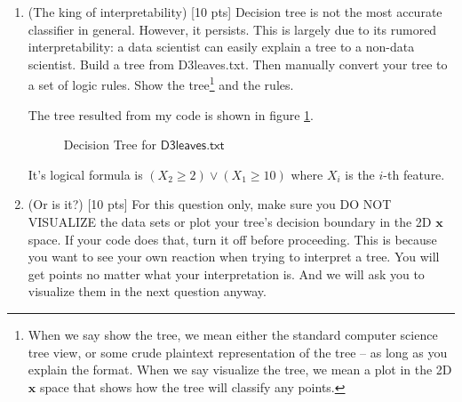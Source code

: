 \documentclass[a4paper]{article}
\theoremstyle{definition}
\def\x{\mathbf x}
\newenvironment{soln}{
    \leavevmode\color{blue}\ignorespaces
}{}
\begin{document}
\begin{enumerate}
\begin{soln}
\end{soln}

\item (The king of interpretability)  [10 pts] Decision tree is not the most accurate classifier in general.  However, it persists.  This is largely due to its rumored interpretability: a data scientist can easily explain a tree to a non-data scientist.  Build a tree from D3leaves.txt.  Then manually convert your tree to a set of logic rules.  Show the tree\footnote{When we say show the tree, we mean either the standard computer science tree view, or some crude plaintext representation of the tree -- as long as you explain the format.  When we say visualize the tree, we mean a plot in the 2D $\x$ space that shows how the tree will classify any points.} and the rules. \\

\begin{soln}
    The tree resulted from my code is shown in figure \ref{fig:2}.
    \begin{figure}[H]
        \centering
        \caption{Decision Tree for $\mathsf{D3leaves.txt}$}
        \label{fig:2}
    \end{figure}

    It's logical formula is $(X_2 \geq 2) \vee (X_1 \geq 10)$ where $X_i$ is the $i$-th feature.
    
\end{soln}

\item (Or is it?)  [10 pts] For this question only, make sure you DO NOT VISUALIZE the data sets or plot your tree's decision boundary in the 2D $\x$ space.  If your code does that, turn it off before proceeding.  This is because you want to see your own reaction when trying to interpret a tree.  You will get points no matter what your interpretation is.
And we will ask you to visualize them in the next question anyway.
  \begin{itemize}
  

\end{itemize}
\end{enumerate}
\end{document}
